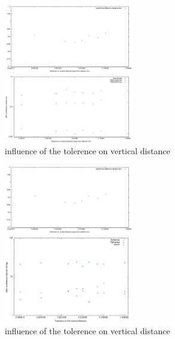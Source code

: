 \documentclass[twoside,twocolumn,11pt]{article} %
\begin{document}
\begin{figure}
	\begin{minipage}{\textwidth}
		\includegraphics[width=0.5\textwidth]{figures/ZtolVsTime2.pdf}
	\end{minipage}
	\begin{minipage}{\textwidth}
		\includegraphics[width=0.5\textwidth]{figures/ZtolVsSigmaTime.pdf}
	\end{minipage}
\caption{influence of the tolerence on vertical distance}
\label{fig:ztolinfl}
\end{figure}
\begin{figure}
	\begin{minipage}{\textwidth}
		\includegraphics[width=0.5\textwidth]{figures/ZtolVsTime2.pdf}
	\end{minipage}
	\begin{minipage}{\textwidth}
		\includegraphics[width=0.5\textwidth]{figures/ZtolVsSigmaAZ.pdf}
	\end{minipage}
\caption{influence of the tolerence on vertical distance}
\label{fig:ztolinfl2}
\end{figure}
\end{document}

